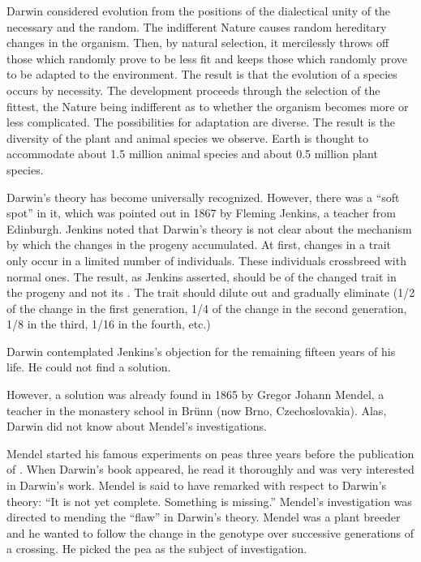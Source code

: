 Darwin considered evolution from the positions of the dialectical
unity of the necessary and the random. The indifferent Nature causes
random hereditary changes in the organism. Then, by natural selection,
it mercilessly throws off those which randomly prove to be less fit and
keeps those which randomly prove to be adapted to the environment.
The result is that the evolution of a species occurs by necessity. The
development proceeds through the selection of the fittest, the Nature
being indifferent as to whether the organism becomes more or less
complicated. The possibilities for adaptation are diverse. The result is
the diversity of the plant and animal species we observe. Earth is
thought to accommodate about 1.5 million animal species and about
0.5 million plant species.

Darwin's theory has become universally recognized. However, there
was a ``soft spot'' in it, which was pointed out in 1867 by Fleming
Jenkins, a teacher from Edinburgh. Jenkins noted that Darwin's theory
is not clear about the mechanism by which the changes in the progeny
accumulated. At first, changes in a trait only occur in a limited number
of individuals. These individuals crossbreed with normal ones. The
result, as Jenkins asserted, should be  of the changed trait in the progeny and not its . The trait should dilute out and gradually eliminate (1/2 of the change in the first generation, 1/4 of the change in the second generation, 1/8 in the third, 1/16 in the fourth,
etc.)

Darwin contemplated Jenkins's objection for the remaining fifteen
years of his life. He could not find a solution.

However, a solution was already found in 1865 by Gregor Johann
Mendel, a teacher in the monastery school in Br\"unn (now Brno,
Czechoslovakia). Alas, Darwin did not know about Mendel's
investigations.

 Mendel started his famous
experiments on peas three years before the publication of . When Darwin's book appeared, he read it thoroughly and was very interested in Darwin's work. Mendel is said to have remarked with
respect to Darwin's theory: ``It is not yet complete. Something is
missing.'' Mendel's investigation was directed to mending the ``flaw'' in
Darwin's theory. Mendel was a plant breeder and he wanted to follow
the change in the genotype over successive generations of a crossing. He
picked the pea as the subject of investigation.

